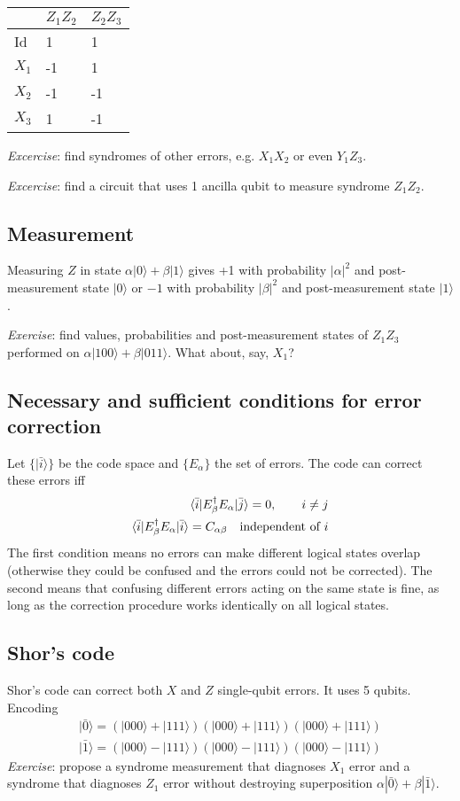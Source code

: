 \documentclass[12 pt]{article}
\begin{document}
\begin{tabular}{lll}
	& $Z_1 Z_2$ & $Z_2 Z_3$ \\ \hline
	Id   & 1         & 1         \\ \hline
	$X_1$ & -1        & 1         \\ \hline
	$X_2$ & -1        & -1       \\ \hline
	$X_3$ & 1         & -1       
\end{tabular}

\textit{Excercise}: find syndromes of other errors, e.g. $X_1X_2$ or even $Y_1 Z_3$.

\textit{Excercise}: find a circuit that uses 1 ancilla qubit to measure syndrome $Z_1Z_2$.


\subsection{Measurement}
Measuring $Z$ in state $\alpha|0\rangle+\beta|1\rangle$ gives +1 with probability $|\alpha|^2$ and post-measurement state $|0\rangle$ or $-1$ with probability $|\beta|^2$ and post-measurement state $|1\rangle$. 

\textit{Exercise}: find values, probabilities and post-measurement states of $Z_1 Z_3$ performed on $\alpha|100\rangle+\beta|011\rangle$. What about, say, $X_1$?
\subsection{Necessary and sufficient conditions for error correction}

Let $\{|\bar{i}\rangle\}$ be the code space and $\{E_\alpha\}$ the set of errors. The code can correct these errors iff
\begin{align}
\braket{\bar{i}|E^\dagger_\beta E_\alpha|\bar{j}}=0,\qquad i\neq j\\
\braket{\bar{i}|E^\dagger_\beta E_\alpha|\bar{i}}=C_{\alpha\beta} \quad\text{independent of $i$}
\end{align}
The first condition means no errors can make different logical states overlap (otherwise they could be confused and the errors could not be corrected). The second means that confusing different errors acting on the same state is fine, as long as the correction procedure works identically on all logical states.
\subsection{Shor's code}
Shor's code can correct both $X$ and $Z$ single-qubit errors. It uses 5 qubits. Encoding
\begin{align}
|\bar{0}\rangle=(|000\rangle+|111\rangle)(|000\rangle+|111\rangle)(|000\rangle+|111\rangle)\\
|\bar{1}\rangle=(|000\rangle-|111\rangle)(|000\rangle-|111\rangle)(|000\rangle-|111\rangle)
\end{align}
\textit{Exercise}: propose a syndrome measurement that diagnoses $X_1$ error and a syndrome that diagnoses $Z_1$ error without destroying superposition $\alpha|\bar{0}\rangle+\beta|\bar{1}\rangle$.
\end{document}
